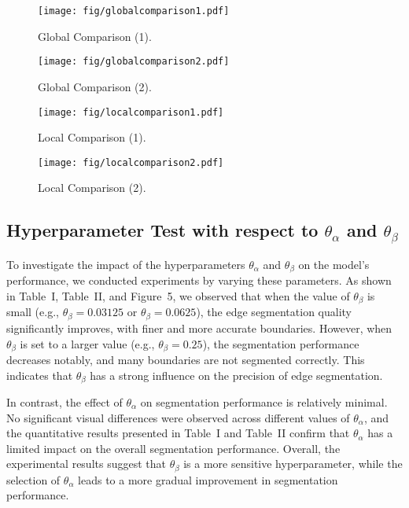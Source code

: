 \documentclass[journal]{IEEEtran}
\begin{document}
\begin{figure*}
  \centering
  \texttt{[image: fig/globalcomparison1.pdf]}
  \caption{Global Comparison (1).}
  \label{fig:globalcomparison1}
\end{figure*}

\begin{figure*}
  \centering
  \texttt{[image: fig/globalcomparison2.pdf]}
  \caption{Global Comparison (2).}
  \label{fig:globalcomparison2}
\end{figure*}

\begin{figure*}
  \centering
  \texttt{[image: fig/localcomparison1.pdf]}
  \caption{Local Comparison (1).}
  \label{fig:localcomparison1}
\end{figure*}

\begin{figure*}
  \centering
  \texttt{[image: fig/localcomparison2.pdf]}
  \caption{Local Comparison (2).}
  \label{fig:localcomparison2}
\end{figure*}

\subsection{Hyperparameter Test with respect to $\theta_{\alpha}$ and $\theta_{\beta}$}
\label{subsec:hyperparameter}
To investigate the impact of the hyperparameters $\theta_\alpha$ and $\theta_\beta$ on the model's performance, we conducted experiments by varying these parameters. As shown in Table~I, Table~II, and Figure~5, we observed that when the value of $\theta_\beta$ is small (e.g., $\theta_\beta = 0.03125$ or $\theta_\beta = 0.0625$), the edge segmentation quality significantly improves, with finer and more accurate boundaries. However, when $\theta_\beta$ is set to a larger value (e.g., $\theta_\beta = 0.25$), the segmentation performance decreases notably, and many boundaries are not segmented correctly. This indicates that $\theta_\beta$ has a strong influence on the precision of edge segmentation.

In contrast, the effect of $\theta_\alpha$ on segmentation performance is relatively minimal. No significant visual differences were observed across different values of $\theta_\alpha$, and the quantitative results presented in Table~I and Table~II confirm that $\theta_\alpha$ has a limited impact on the overall segmentation performance. Overall, the experimental results suggest that $\theta_\beta$ is a more sensitive hyperparameter, while the selection of $\theta_\alpha$ leads to a more gradual improvement in segmentation performance.
\end{document}
